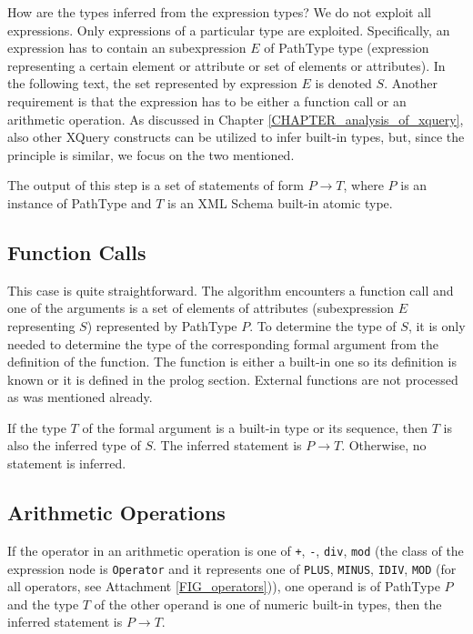 How are the types inferred from the expression types? We do not exploit all expressions. Only expressions of a particular type are exploited. Specifically, an expression has to contain an subexpression $E$ of PathType type (expression representing a certain element or attribute or set of elements or attributes). In the following text, the set represented by expression $E$ is denoted $S$. Another requirement is that the expression has to be either a function call or an arithmetic operation. As discussed in Chapter \ref{CHAPTER_analysis_of_xquery}, also other XQuery constructs can be utilized to infer built-in types, but, since the principle is similar, we focus on the two mentioned.

The output of this step is a set of statements of form $P \rightarrow T$, where $P$ is an instance of PathType and $T$ is an XML Schema built-in atomic type.

\subsection{Function Calls}
This case is quite straightforward. The algorithm encounters a function call and one of the arguments is a set of elements of attributes (subexpression $E$ representing $S$) represented by PathType $P$. To determine the type of $S$, it is only needed to determine the type of the corresponding formal argument from the definition of the function. The function is either a built-in one so its definition is known or it is defined in the prolog section. External functions are not processed as was mentioned already.

If the type $T$ of the formal argument is a built-in type or its sequence, then $T$ is also the inferred type of $S$. The inferred statement is $P \rightarrow T$. Otherwise, no statement is inferred.

\subsection{Arithmetic Operations}
If the operator in an arithmetic operation is one of \texttt{+}, \texttt{-}, \texttt{div}, \texttt{mod} (the class of the expression node is \texttt{Operator} and it represents one of \texttt{PLUS}, \texttt{MINUS}, \texttt{IDIV}, \texttt{MOD} (for all operators, see Attachment \ref{FIG_operators})), one operand is of PathType $P$ and the type $T$ of the other operand is one of numeric built-in types, then the inferred statement is $P \rightarrow T$.


